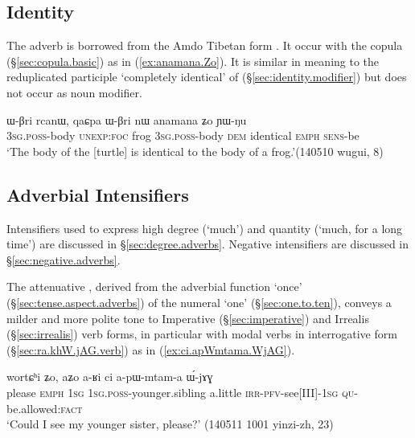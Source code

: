 \subsection{Identity} \label{sec:identity.adverbs}
The adverb  is borrowed from the Amdo Tibetan form . It occur with the copula  (§\ref{sec:copula.basic}) as in (\ref{ex:anamana.Zo}). It is similar in meaning to the reduplicated participle  `completely identical' of  (§\ref{sec:identity.modifier}) but does not occur as noun modifier. 

\begin{exe}
\ex \label{ex:anamana.Zo}
 \gll ɯ-βri rcanɯ, qaɕpa ɯ-βri nɯ anamana ʑo ɲɯ-ŋu \\
 \textsc{3sg}.\textsc{poss}-body \textsc{unexp}:\textsc{foc} frog  \textsc{3sg}.\textsc{poss}-body \textsc{dem} identical \textsc{emph} \textsc{sens}-be \\
\glt `The body of the [turtle] is identical to the body of a frog.'(140510 wugui, 8)
\end{exe}

\subsection{Adverbial Intensifiers} \label{sec:intensifier.adverbs}
Intensifiers used to express high degree (`much') and quantity (`much, for a long time') are discussed in §\ref{sec:degree.adverbs}. Negative intensifiers are discussed in §\ref{sec:negative.adverbs}.

The attenuative , derived from the adverbial function `once' (§\ref{sec:tense.aspect.adverbs}) of the numeral  `one' (§\ref{sec:one.to.ten}),  conveys a milder and more polite tone to Imperative (§\ref{sec:imperative}) and Irrealis (§\ref{sec:irrealis}) verb forms, in particular with modal verbs in interrogative form (§\ref{sec:ra.khW.jAG.verb}) as in (\ref{ex:ci.apWmtama.WjAG}).

 \begin{exe}
\ex \label{ex:ci.apWmtama.WjAG}
\gll wortɕʰi ʑo, aʑo a-ʁi ci a-pɯ-mtam-a ɯ́-jɤɣ \\
please \textsc{emph} \textsc{1sg} \textsc{1sg}.\textsc{poss}-younger.sibling a.little \textsc{irr}-\textsc{pfv}-see[III]-\textsc{1sg} \textsc{qu}-be.allowed:\textsc{fact} \\
\glt  `Could I see my younger sister, please?' (140511 1001 yinzi-zh, 23)
 \end{exe} 
 
